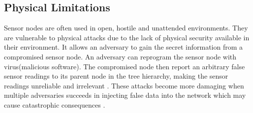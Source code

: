 	\subsection{Physical Limitations}
		Sensor nodes are often used in open, hostile and unattended environments.
		They are vulnerable to physical attacks due to the lack of physical security available in their environment.
		It allows an adversary to gain the secret information from a compromised sensor node.
		An adversary can reprogram the sensor node with virus(malicious software).
		The compromised node then report an arbitrary false sensor readings to its parent node in the tree hierarchy, making the sensor readings unreliable and irrelevant	.
		These attacks become more damaging when multiple adversaries succeeds in injecting false data into the network which may cause catastrophic consequences \cite{wagner2007algorithms}.	

